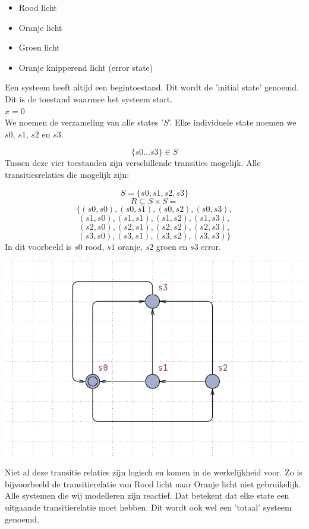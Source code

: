 \documentclass{article}
\begin{document}
		\begin{itemize}
			\item Rood licht
			\item Oranje licht
			\item Groen licht
			\item Oranje knipperend licht (error state)
		\end{itemize}
		Een systeem heeft altijd een begintoestand. Dit wordt de 'initial state' genoemd. Dit is de toestand waarmee het systeem start. \\ 
		\(x = 0\) \\
		We noemen de verzameling van alle states '\(S\)'. Elke individuele state noemen we \(s0\), \(s1\), \(s2\) en \(s3\).

		\[\{s0 ... s3\} \in S\]
		Tussen deze vier toestanden zijn verschillende transities mogelijk. Alle transitiesrelaties die mogelijk zijn:

		\[S = \{s0, s1, s2, s3\} \]
		\[R \subseteq S \times S = \]
		\[\{	(s0, s0), (s0, s1), (s0, s2), (s0, s3),\]
		\[	(s1, s0), (s1, s1), (s1, s2), (s1, s3),\]
		\[	(s2, s0), (s2, s1), (s2, s2), (s2, s3),\]
		\[	(s3, s0), (s3, s1), (s3, s2), (s3, s3)
		\}\]
		In dit voorbeeld is  \(s0\) rood, \(s1\) oranje, \(s2\) groen en \(s3\) error.
		\begin{center}
			\begin{minipage}{0.8\textwidth}
				\includegraphics[width=\textwidth]{stoplicht-uppaal.png}
			\end{minipage}
			\hfill
		\end{center}
		Niet al deze transitie relaties zijn logisch en komen in de werkelijkheid voor. Zo is bijvoorbeeld de transitierelatie van Rood licht naar Oranje licht niet gebruikelijk. \\		
		Alle systemen die wij modelleren zijn reactief. Dat betekent dat elke state een uitgaande transitierelatie moet hebben. Dit wordt ook wel een 'totaal' systeem genoemd.
		
\end{document}
